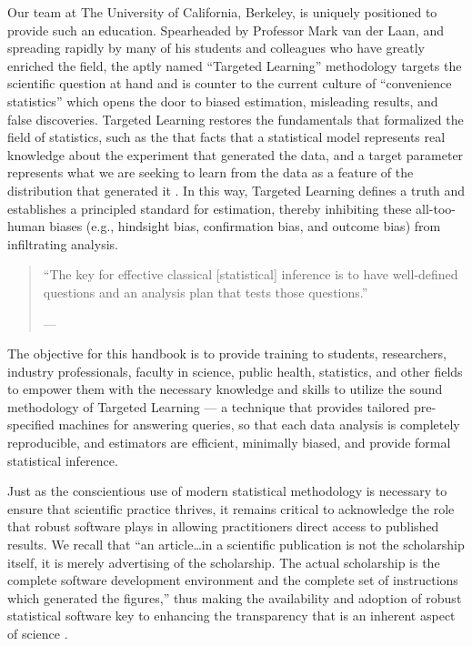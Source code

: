 \documentclass[12pt, krantz2,]{krantz}
\theoremstyle{definition}
\theoremstyle{definition}
\theoremstyle{definition}
\newcommand{\1}{\mathbbm{1}}
\begin{document}
Our team at The University of California, Berkeley, is uniquely positioned to
provide such an education. Spearheaded by Professor Mark van der Laan, and
spreading rapidly by many of his students and colleagues who have greatly
enriched the field, the aptly named ``Targeted Learning'' methodology targets the
scientific question at hand and is counter to the current culture of
``convenience statistics'' which opens the door to biased estimation, misleading
results, and false discoveries. Targeted Learning restores the fundamentals that
formalized the field of statistics, such as the that facts that a statistical
model represents real knowledge about the experiment that generated the data,
and a target parameter represents what we are seeking to learn from the data as
a feature of the distribution that generated it \citep{vdl2014entering}. In this way,
Targeted Learning defines a truth and establishes a principled standard for
estimation, thereby inhibiting these all-too-human biases (e.g., hindsight bias,
confirmation bias, and outcome bias) from infiltrating analysis.

\begin{quote}
``The key for effective classical {[}statistical{]} inference is to have
well-defined questions and an analysis plan that tests those questions.''

--- \citet{nosek2018preregistration}
\end{quote}

The objective for this handbook is to provide training to students, researchers,
industry professionals, faculty in science, public health, statistics, and other
fields to empower them with the necessary knowledge and skills to utilize the
sound methodology of Targeted Learning --- a technique that provides tailored
pre-specified machines for answering queries, so that each data analysis is
completely reproducible, and estimators are efficient, minimally biased, and
provide formal statistical inference.

Just as the conscientious use of modern statistical methodology is necessary to
ensure that scientific practice thrives, it remains critical to acknowledge the
role that robust software plays in allowing practitioners direct access to
published results. We recall that ``an article\ldots{}in a scientific publication is
not the scholarship itself, it is merely advertising of the scholarship. The
actual scholarship is the complete software development environment and the
complete set of instructions which generated the figures,'' thus making the
availability and adoption of robust statistical software key to enhancing the
transparency that is an inherent aspect of science \citep{buckheit1995wavelab}.
\end{document}
